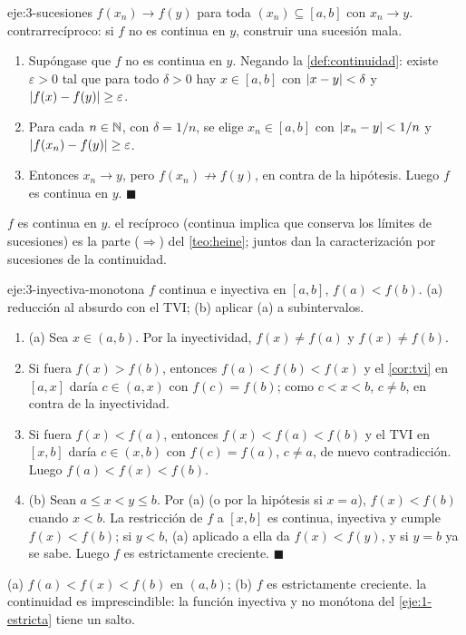 \begin{solucion}{eje:3-sucesiones}
\datos $f(x_n)\to f(y)$ para toda $(x_n)\subseteq[a,b]$ con $x_n\to y$.
\planteamiento contrarrecíproco: si $f$ no es continua en $y$, construir una sucesión mala.
\pasos
\begin{enumerate}[label=\arabic*.]
  \item Supóngase que $f$ no es continua en $y$. Negando la \cref{def:continuidad}: existe $\varepsilon>0$ tal que para todo $\delta>0$ hay $x\in[a,b]$ con $\lvert x-y\rvert<\delta$ y $\lvert f(x)-f(y)\rvert\ge\varepsilon$.
  \item Para cada $n\in\mathbb{N}$, con $\delta=1/n$, se elige $x_n\in[a,b]$ con $\lvert x_n-y\rvert<1/n$ y $\lvert f(x_n)-f(y)\rvert\ge\varepsilon$.
  \item Entonces $x_n\to y$, pero $f(x_n)\not\to f(y)$, en contra de la hipótesis. Luego $f$ es continua en $y$. \hfill$\blacksquare$
\end{enumerate}
\resultado $f$ es continua en $y$.
\comprobacion el recíproco (continua implica que conserva los límites de sucesiones) es la parte ($\Rightarrow$) del \cref{teo:heine}; juntos dan la caracterización por sucesiones de la continuidad.
\end{solucion}

\begin{solucion}{eje:3-inyectiva-monotona}
\datos $f$ continua e inyectiva en $[a,b]$, $f(a)<f(b)$.
\planteamiento (a) reducción al absurdo con el TVI; (b) aplicar (a) a subintervalos.
\pasos
\begin{enumerate}[label=\arabic*.]
  \item (a) Sea $x\in(a,b)$. Por la inyectividad, $f(x)\ne f(a)$ y $f(x)\ne f(b)$.
  \item Si fuera $f(x)>f(b)$, entonces $f(a)<f(b)<f(x)$ y el \cref{cor:tvi} en $[a,x]$ daría $c\in(a,x)$ con $f(c)=f(b)$; como $c<x<b$, $c\ne b$, en contra de la inyectividad.
  \item Si fuera $f(x)<f(a)$, entonces $f(x)<f(a)<f(b)$ y el TVI en $[x,b]$ daría $c\in(x,b)$ con $f(c)=f(a)$, $c\ne a$, de nuevo contradicción. Luego $f(a)<f(x)<f(b)$.
  \item (b) Sean $a\le x<y\le b$. Por (a) (o por la hipótesis si $x=a$), $f(x)<f(b)$ cuando $x<b$. La restricción de $f$ a $[x,b]$ es continua, inyectiva y cumple $f(x)<f(b)$; si $y<b$, (a) aplicado a ella da $f(x)<f(y)$, y si $y=b$ ya se sabe. Luego $f$ es estrictamente creciente. \hfill$\blacksquare$
\end{enumerate}
\resultado (a) $f(a)<f(x)<f(b)$ en $(a,b)$; (b) $f$ es estrictamente creciente.
\comprobacion la continuidad es imprescindible: la función inyectiva y no monótona del \cref{eje:1-estricta} tiene un salto.
\end{solucion}

